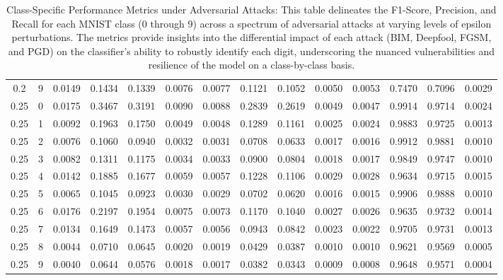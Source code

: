\documentclass[10pt, conference, a4paper, final]{IEEEtran}
\begin{document}
\begin{table}[ht]
{\begin{tabular}{cccccccccccccc}
        0.2 & 9 & 0.0149 & 0.1434 & 0.1339 & 0.0076 & 0.0077 & 0.1121 & 0.1052 & 0.0050 & 0.0053 & 0.7470 & 0.7096 & 0.0029 \\
        0.25 & 0 & 0.0175 & 0.3467 & 0.3191 & 0.0090 & 0.0088 & 0.2839 & 0.2619 & 0.0049 & 0.0047 & 0.9914 & 0.9714 & 0.0024 \\
        0.25 & 1 & 0.0092 & 0.1963 & 0.1750 & 0.0049 & 0.0048 & 0.1289 & 0.1161 & 0.0025 & 0.0024 & 0.9883 & 0.9725 & 0.0013 \\
        0.25 & 2 & 0.0076 & 0.1060 & 0.0940 & 0.0032 & 0.0031 & 0.0708 & 0.0633 & 0.0017 & 0.0016 & 0.9912 & 0.9881 & 0.0010 \\
        0.25 & 3 & 0.0082 & 0.1311 & 0.1175 & 0.0034 & 0.0033 & 0.0900 & 0.0804 & 0.0018 & 0.0017 & 0.9849 & 0.9747 & 0.0010 \\
        0.25 & 4 & 0.0142 & 0.1885 & 0.1677 & 0.0059 & 0.0057 & 0.1228 & 0.1106 & 0.0029 & 0.0028 & 0.9634 & 0.9715 & 0.0015 \\
        0.25 & 5 & 0.0065 & 0.1045 & 0.0923 & 0.0030 & 0.0029 & 0.0702 & 0.0620 & 0.0016 & 0.0015 & 0.9906 & 0.9888 & 0.0010 \\
        0.25 & 6 & 0.0176 & 0.2197 & 0.1954 & 0.0075 & 0.0073 & 0.1170 & 0.1040 & 0.0027 & 0.0026 & 0.9635 & 0.9732 & 0.0014 \\
        0.25 & 7 & 0.0134 & 0.1649 & 0.1473 & 0.0057 & 0.0056 & 0.0943 & 0.0842 & 0.0023 & 0.0022 & 0.9705 & 0.9731 & 0.0013 \\
        0.25 & 8 & 0.0044 & 0.0710 & 0.0645 & 0.0020 & 0.0019 & 0.0429 & 0.0387 & 0.0010 & 0.0010 & 0.9621 & 0.9569 & 0.0005 \\
        0.25 & 9 & 0.0040 & 0.0644 & 0.0576 & 0.0018 & 0.0017 & 0.0382 & 0.0343 & 0.0009 & 0.0008 & 0.9648 & 0.9571 & 0.0004 \\              
        \bottomrule
    \end{tabular}
    }

    \caption{Class-Specific Performance Metrics under Adversarial Attacks: This table delineates the F1-Score, Precision, and Recall for each MNIST class (0 through 9) across a spectrum of adversarial attacks at varying levels of epsilon perturbations. The metrics provide insights into the differential impact of each attack (BIM, Deepfool, FGSM, and PGD) on the classifier's ability to robustly identify each digit, underscoring the nuanced vulnerabilities and resilience of the model on a class-by-class basis.}

    \label{table2}
    \end{table}
\end{document}

